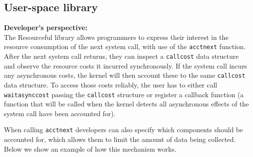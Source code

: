 \documentclass[12pt]{article}
\def\_{\textunderscore\-}
\begin{document}
\subsection{User-space library}
\textbf{Developer’s perspective:\\}
The Resourceful library allows programmers to express their interest in the resource consumption of the next system call, with use of the \texttt{acct\_next} function. After the next system call returns, they can inspect a \texttt{call\_cost} data structure and observe the resource costs it incurred synchronously. 
If the system call incurs any asynchronous costs, the kernel will then account these to the same \texttt{call\_cost} data structure. To access those costs reliably, the user has to either call \texttt{wait\_async\_cost} passing the \texttt{call\_cost} structure or register a callback function (a function that will be called when the kernel detects all asynchronous effects of the system call have been accounted for).

When calling \texttt{acct\_next} developers can also specify which components should be accounted for, which allows them to limit the amount of data being collected.
Below we show an example of how this mechanism works.
\end{document}
